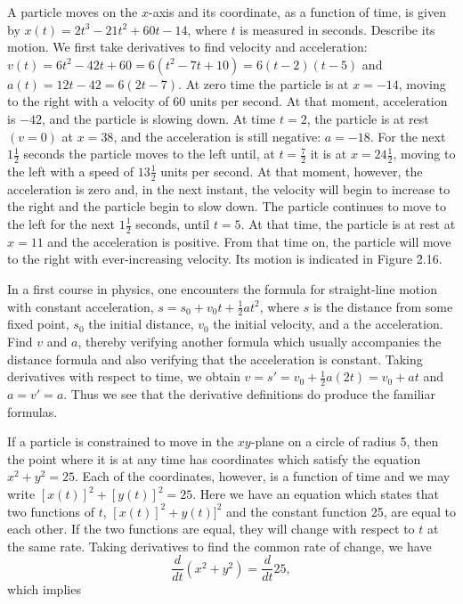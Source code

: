 \begin{example}
A particle moves on the $x$-axis and its coordinate, as a function of time, is given by $x(t) = 2t^3 - 21t^2 + 60t - 14$, where $t$ is measured in seconds. Describe its motion. We first take derivatives to find velocity and acceleration: $v(t) = 6t^2 - 42t + 60 = 6(t^2 - 7t + 10) = 6(t - 2)(t - 5)$ and $a(t) = 12t - 42 = 6(2t - 7)$. At zero time the particle is at $x = -14$, moving to the right with a velocity of 60 units per second. At that moment, acceleration is $-42$, and the particle is slowing down. At time $t = 2$, the particle is at rest $(v = 0)$ at $x = 38$, and the acceleration is still negative: $a = -18$. For the next $1\frac{1}{2}$ seconds the particle moves to the left until, at $t = \frac{7}{2}$ it is at $x = 24\frac{1}{2}$, moving to the left with a speed of $13\frac{1}{2}$ units per second. At that moment, however, the acceleration is zero and, in the next instant, the velocity will begin to increase to the right and the particle begin to slow down. The particle continues to move to the left for the next $1\frac{1}{2}$ seconds, until $t = 5$. At that time, the particle is at rest at $x = 11$ and the acceleration is positive. From that time on, the particle will move to the right with ever-increasing velocity. Its motion is indicated in Figure \f{2.16}.
\end{example}
\medskip


\begin{example}
In a first course in physics, one encounters the formula for straight-line motion with constant acceleration, $s = s_0 + v_{0}t + \frac{1}{2} a{t^2}$, where $s$ is the distance from some fixed point, $s_0$ the initial distance, $v_0$ the initial velocity, and a the acceleration. Find $v$ and $a$, thereby verifying another formula which usually accompanies the distance formula and also verifying that the acceleration is constant. Taking derivatives with respect to time, we obtain $v = s' = v_0 + \frac{1}{2}a(2t) = v_0 + at$ and $a = v' = a$. Thus we see that the derivative definitions do produce the familiar formulas.
\end{example}
\medskip

If a particle is constrained to move in the $xy$-plane on a circle of radius 5, then the point where it is at any time has coordinates which satisfy the equation $x^2 + y^2 = 25$. Each of the coordinates, however, is a function of time and we may write $[x(t)]^2 + [y(t)]^2 = 25$. Here we have an equation which states that two functions of $t$, $[x(t)]^2 + y(t)]^2$ and the constant function 25, are equal to each other. If the two functions are equal, they will change with respect to $t$ at the same rate. Taking derivatives to find the common rate of change, we have
$$
\frac{d}{dt} (x^2 + y^2 ) = \frac{d}{dt} 25, 
$$
\noindent which implies

